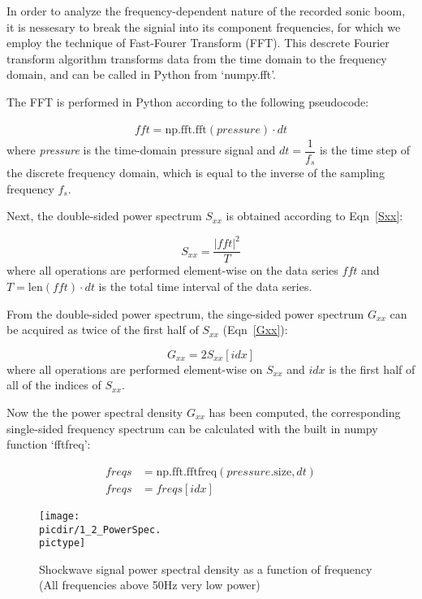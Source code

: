 \documentclass[twocolumn,10pt]{asme2ej}
\begin{document}
In order to analyze the frequency-dependent nature of the recorded sonic boom, it is nessesary to break the signial into its component frequencies, for which we employ the technique of Fast-Fourer Transform (FFT).  This descrete Fourier transform algorithm transforms data from the time domain to the frequency domain, and can be called in Python from `numpy.fft'.

The FFT is performed in Python according to the following pseudocode:

\begin{gather*}
fft = \text{np.fft.fft}(pressure)\cdot dt
\end{gather*}
\noindent where \emph{pressure} is the time-domain pressure signal and $dt=\dfrac{1}{f_s}$ is the time step of the discrete frequency domain, which is equal to the inverse of the sampling frequency $f_s$.

\noindent Next, the double-sided power spectrum $S_{xx}$ is obtained according to Eqn~\ref{Sxx}:

\begin{equation} \label{Sxx}
S_{xx} = \frac{|fft|^2}{T}
\end{equation}
\noindent where all operations are performed element-wise on the data series $fft$ and $T=\text{len}(fft)\cdot dt$ is the total time interval of the data series.

From the double-sided power spectrum, the singe-sided power spectrum $G_{xx}$ can be acquired as twice of the first half of $S_{xx}$ (Eqn~\ref{Gxx}):

\begin{equation} \label{Gxx}
G_{xx} = 2S_{xx}[idx]
\end{equation}
\noindent where all operations are performed element-wise on $S_{xx}$ and $idx$ is the first half of all of the indices of $S_{xx}$.

Now the the power spectral density $G_{xx}$ has been computed, the corresponding single-sided frequency spectrum can be calculated with the built in numpy function `fftfreq':

\begin{align*}
freqs &= \text{np.fft.fftfreq}(pressure{}\text{.size}, dt) \\
freqs &= freqs[idx]
\end{align*}


\begin{figure}[htb]
\begin{center}
\texttt{[image: \\picdir/1\_2\_PowerSpec.\\pictype]}
\caption{Shockwave signal power spectral density as a function of frequency (All frequencies above 50Hz very low power)}
\label{PowSpec}
\end{center}
\end{figure}
\end{document}

